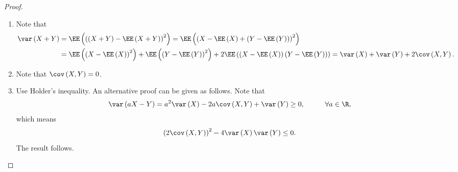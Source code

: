 \documentclass[stat901]{subfiles}
\begin{document}
    \begin{proof}
        \begin{enumerate}
            \item Note that
                \begin{equation*}
                    \begin{aligned}
                        \var\left( X+Y \right) & = \EE\left( \left( \left( X+Y \right)-\EE\left( X+Y \right) \right)^{2} \right) = \EE\left( \left( X-\EE\left( X \right)+\left( Y-\EE\left( Y \right) \right) \right)^{2} \right) \\
                                               & = \EE\left( \left( X-\EE\left( X \right) \right)^{2} \right)+\EE\left( \left( Y-\EE\left( Y \right) \right)^{2} \right) + 2\EE\left( \left( X-\EE\left( X \right) \right)\left( Y-\EE\left( Y \right) \right) \right) = \var\left( X \right)+\var\left( Y \right)+2\cov\left( X,Y \right).
                    \end{aligned} 
                \end{equation*}
            \item Note that $\cov\left( X,Y \right)=0$.

            \item Use Holder's inequality. An alternative proof can be given as follows. Note that
                \begin{equation*}
                    \var\left( aX-Y \right) = a^{2}\var\left( X \right)-2a\cov\left( X,Y \right)+\var\left( Y \right)\geq 0, \hspace{1cm}\forall a\in\R,
                \end{equation*}
                which means
                \begin{equation*}
                    \left( 2\cov\left( X,Y \right) \right)^{2} - 4\var\left( X \right)\var\left( Y \right)\leq 0.
                \end{equation*}
                The result follows.
        \end{enumerate}
    \end{proof}
    
\end{document}
